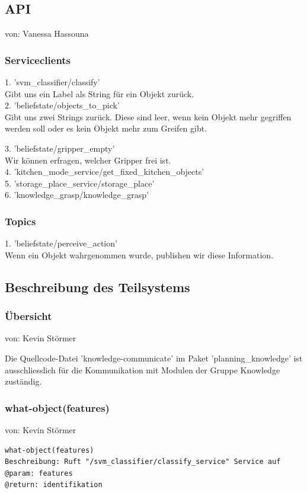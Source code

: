 \documentclass{suturo}
\makeatletter
\newcommand{\chapterauthor}[1]{%
  {\parindent0pt\vspace*{-27pt}%
  \linespread{0}\small\begin{flushright}von: #1\end{flushright}%
  \par\nobreak\vspace*{0pt}}
  \@afterheading%
}
\makeatother
\begin{document}
\subsection{API}
\chapterauthor{Vanessa Hassouna}
\subsubsection{Serviceclients}
1. 'svm\_classifier/classify' \\
Gibt uns ein Label als String für ein Objekt zurück.\\

2. 'beliefstate/objects\_to\_pick'\\
Gibt uns zwei Strings zurück. Diese sind leer, wenn kein Objekt mehr gegriffen werden soll oder es kein Objekt mehr zum Greifen gibt.

3. 'beliefstate/gripper\_empty'\\
Wir können erfragen, welcher Gripper frei ist.\\

4. 'kitchen\_mode\_service/get\_fixed\_kitchen\_objects'\\

5. 'storage\_place\_service/storage\_place'\\

6. 'knowledge\_grasp/knowledge\_grasp'\\
\subsubsection{Topics}
1. 'beliefstate/perceive\_action'\\
Wenn ein Objekt wahrgenommen wurde, publishen wir diese Information.


\subsection{Beschreibung des Teilsystems}
\subsubsection{\"Ubersicht}
\chapterauthor{Kevin Störmer}
Die Quellcode-Datei 'knowledge-communicate' im Paket 'planning\_knowledge' ist ausschliesslich für die Kommunikation mit Modulen der Gruppe Knowledge zust\"andig.

\subsubsection{what-object(features)}
\chapterauthor{Kevin Störmer}
\begin{verbatim}
what-object(features)
Beschreibung: Ruft "/svm_classifier/classify_service" Service auf
@param: features
@return: identifikation
\end{verbatim}
\end{document}
